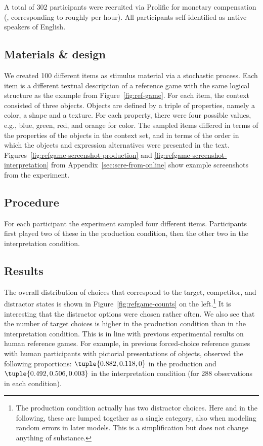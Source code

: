 \documentclass[fleqn]{article}
\begin{document}
A total of 302 participants were recruited via Prolific for monetary
compensation (, corresponding to roughly  per hour).
All participants self-identified as native speakers of English.

\subsection{Materials \& design}
\label{materials-design}

We created 100 different items as stimulus material via a stochastic process.
Each item is a different textual description of a reference game with the same logical structure as the example from Figure~\ref{fig:ref-game}.
For each item, the context consisted of three objects.
Objects are defined by a triple of properties, namely a color, a shape and a texture.
For each property, there were four possible values, e.g., blue, green, red, and orange for color.
The sampled items differed in terms of the properties of the objects in the context set, and in terms of the order in which the objects and expression alternatives were presented in the text.
Figures~\ref{fig:refgame-screenshot-production} and \ref{fig:refgame-screenshot-interpretation} from Appendix~\ref{sec:scre-from-online} show example screenshots from the experiment.

\subsection{Procedure}
\label{procedure}

For each participant the experiment sampled four different items.
Participants first played two of these in the production condition, then the other two in the interpretation condition.


\subsection{Results}\label{results}

The overall distribution of choices that correspond to the target, competitor, and distractor states is shown in Figure~\ref{fig:refgame-counts} on the left.\footnote{
  The production condition actually has two distractor choices.
  Here and in the following, these are lumped together as a single category, also when modeling random errors in later models.
  This is a simplification but does not change anything of substance.}
It is interesting that the distractor options were chosen rather often.
We also see that the number of target choices is higher in the production condition than in the interpretation condition.
This is in line with previous experimental results on human reference games.
For example, in previous forced-choice reference games with human participants with pictorial presentations of objects, \citet{QingFranke2013:Variations-on-a} observed the following proportions: $\tuple{0.882, 0.118, 0}$ in the production and $\tuple{0.492, 0.506, 0.003}$ in the interpretation condition (for 288 observations in each condition).
\end{document}
